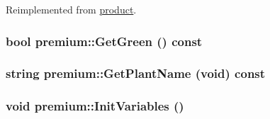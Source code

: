 Reimplemented from \hyperlink{classproduct_a18a1df87f3400774db21d1e8c573f04a}{product}.\hypertarget{classpremium_aec85213df0f2457aed457c3540956548}{
\subsubsection[{GetGreen}]{\setlength{\rightskip}{0pt plus 5cm}bool premium::GetGreen () const}}
\label{classpremium_aec85213df0f2457aed457c3540956548}
\hypertarget{classpremium_a1995a83a73c5770b4ef3eb63ababb692}{
\subsubsection[{GetPlantName}]{\setlength{\rightskip}{0pt plus 5cm}string premium::GetPlantName (void) const}}
\label{classpremium_a1995a83a73c5770b4ef3eb63ababb692}
\hypertarget{classpremium_a18e6e7832622598ea24cb385a78f3a50}{
\subsubsection[{InitVariables}]{\setlength{\rightskip}{0pt plus 5cm}void premium::InitVariables ()}}
\label{classpremium_a18e6e7832622598ea24cb385a78f3a50}


